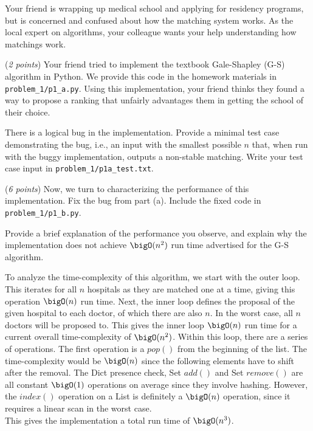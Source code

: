 \documentclass{hw_template}
\begin{document}

\begin{problem}
Your friend is wrapping up medical school
and applying for residency programs, but is concerned and confused about how the matching
system works. As the local expert on algorithms, your colleague wants your 
help understanding how matchings work. 


\begin{subproblem}
  (\textit{2 points})
  Your friend tried to implement the textbook Gale-Shapley (G-S)
  algorithm in Python. We provide this code in the homework materials in \texttt{problem\_1/p1\_a.py}. 
  Using this implementation, your friend thinks they found a way to propose a
  ranking that unfairly advantages them in getting the school of their choice.

  There is a logical bug in the implementation. Provide a minimal test case
  demonstrating the bug, i.e., an input with the smallest possible $n$ 
  that, when run with the buggy implementation, outputs a non-stable matching. Write your test case input in \texttt{problem\_1/p1a\_test.txt}.  
  
\end{subproblem}

\begin{subproblem}
  (\textit{6 points})
  Now, we turn to characterizing the performance of
  this implementation. Fix the bug from part (a). Include the fixed code in \texttt{problem\_1/p1\_b.py}.

  Provide a brief explanation of the performance you observe, and explain why the implementation does not achieve $\bigO(n^2)$ run time advertised for the G-S algorithm.
\end{subproblem}

\begin{solution}
To analyze the time-complexity of this algorithm, we start with the outer loop. This iterates for all $n$ hospitals as they are matched one at a time, giving this operation
$\bigO(n)$ run time. Next, the inner loop defines the proposal of the given hospital to each doctor, of which there are also $n$. In the worst case, all $n$ doctors will be proposed to.
This gives the inner loop $\bigO(n)$ run time for a current overall time-complexity of $\bigO(n^2)$. Within this loop, there are a series of operations. The first operation is a $pop()$ from the beginning of the list. The time-complexity 
would be $\bigO(n)$ since the following elements have to shift after the removal. The Dict presence check, Set $add()$ and Set $remove()$ 
are all constant $\bigO(1)$ operations on average since they involve hashing. However, the $index()$ operation on a List is definitely a $\bigO(n)$ operation, since it requires a linear scan in the worst case.
\\This gives the implementation a total run time of $\bigO(n^3)$.
\end{solution}


\end{problem}
\end{document}
